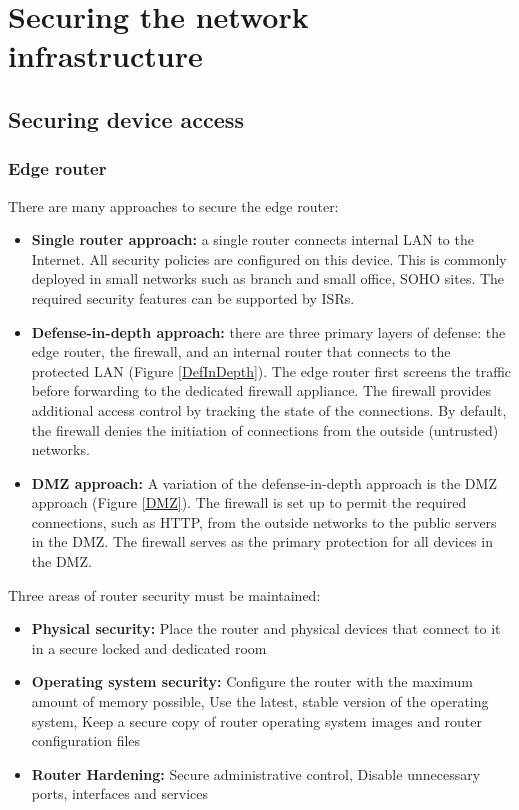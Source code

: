 \chapter{Securing the network infrastructure}

\section{Securing device access}

\subsection{Edge router}

There are many approaches to secure the edge router:

\begin{itemize}
\item \textbf{Single router approach:}  a single router connects internal LAN to the Internet.  All security policies are configured on this device. This is commonly deployed in small networks such as branch and small office, SOHO sites. The required security features can be supported by ISRs.

\item \textbf{Defense-in-depth approach:} there are three primary layers of defense: the edge router, the firewall, and an internal router that connects to the protected LAN (Figure \ref{DefInDepth}). The edge router first screens the traffic before forwarding to the dedicated firewall appliance. The firewall provides additional access control by tracking the state of the connections. By default, the firewall denies the initiation of connections from the outside (untrusted) networks. 

\item \textbf{DMZ approach:} A variation of the defense-in-depth approach is the  DMZ approach (Figure \ref{DMZ}). The firewall is set up to permit the required connections, such as HTTP, from the outside networks to the public servers in the DMZ. The firewall serves as the primary protection for all devices in the DMZ.
\end{itemize}

Three areas of router security must be maintained:

\begin{itemize}
\item \textbf{Physical security:} Place the router and physical devices that connect to it in a secure locked and dedicated room 

\item \textbf{Operating system security:} Configure the router with the maximum amount of memory possible, Use the latest, stable version of the operating system, Keep a secure copy of router operating system images and router configuration files

\item \textbf{Router Hardening:} Secure administrative control, Disable unnecessary ports, interfaces and services
\end{itemize}

